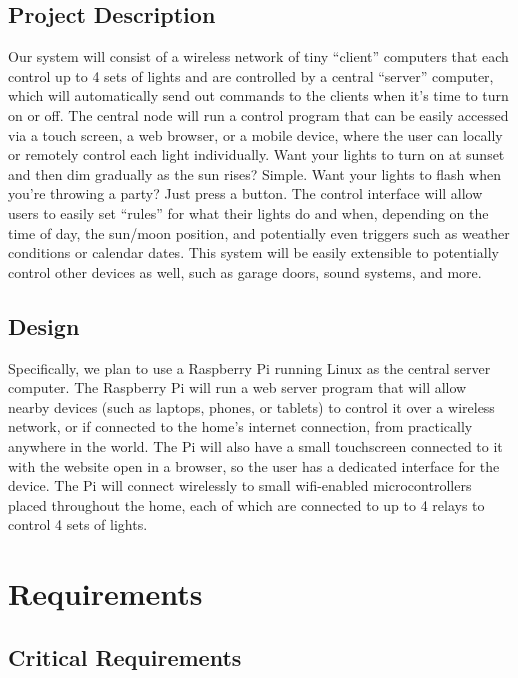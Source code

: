 \documentclass[12pt]{article}
\begin{document}
\subsection{Project Description}

Our system will consist of a wireless network of tiny ``client'' computers that
each control up to 4 sets of lights and are controlled by a central ``server''
computer, which will automatically send out commands to the clients when it's
time to turn on or off.  The central node will run a control program that can
be easily accessed via a touch screen, a web browser, or a mobile device, where
the user can locally or remotely control each light individually.  Want your
lights to turn on at sunset and then dim gradually as the sun rises?  Simple.
Want your lights to flash when you're throwing a party?  Just press a button.
The control interface will allow users to easily set ``rules'' for what their
lights do and when, depending on the time of day, the sun/moon position, and
potentially even triggers such as weather conditions or calendar dates.  This
system will be easily extensible to potentially control other devices as well,
such as garage doors, sound systems, and more.

\subsection{Design}

Specifically, we plan to use a Raspberry Pi running Linux as the central server
computer.  The Raspberry Pi will run a web server program that will allow
nearby devices (such as laptops, phones, or tablets) to control it over a
wireless network, or if connected to the home's internet connection, from
practically anywhere in the world.  The Pi will also have a small touchscreen
connected to it with the website open in a browser, so the user has a dedicated
interface for the device.  The Pi will connect wirelessly to small wifi-enabled
microcontrollers placed throughout the home, each of which are connected to up
to 4 relays to control 4 sets of lights.

\section{Requirements}

\subsection{Critical Requirements}
\end{document}
